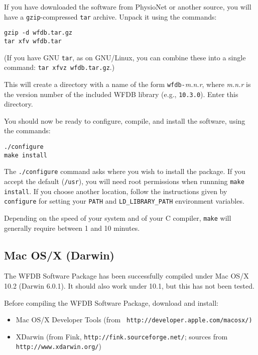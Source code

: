 \documentclass[twoside]{article}
\begin{document}
If you have downloaded the software from PhysioNet or another source, you
will have a {\tt gzip}-compressed {\tt tar} archive.  Unpack it using
the commands:

\begin{verbatim}
gzip -d wfdb.tar.gz
tar xfv wfdb.tar
\end{verbatim}

(If you have GNU {\tt tar}, as on GNU/Linux, you can combine these into a
single command: {\tt tar xfvz wfdb.tar.gz}.)

This will create a directory with a name of the form {\tt wfdb-}{\em m.n.r},
where {\em m.n.r} is the version number of the included WFDB library (e.g.,
{\tt 10.3.0}).  Enter this directory.

You should now be ready to configure, compile, and install the software, using
the commands:

\begin{verbatim}
./configure
make install
\end{verbatim}

The {\tt ./configure} command asks where you wish to install the package.
If you accept the default ({\tt /usr}), you will need root permissions when
runnning {\tt make install}.  If you choose another location, follow the
instructions given by {\tt configure} for setting your {\tt PATH} and
{\tt LD\_LIBRARY\_PATH} environment variables.

Depending on the speed of your system and of your C compiler, {\tt make} will
generally require between 1 and 10 minutes.

\subsection*{Mac OS/X (Darwin)}

The WFDB Software Package has been successfully compiled under Mac
OS/X 10.2 (Darwin 6.0.1).  It should also work under 10.1, but this
has not been tested.

Before compiling the WFDB Software Package, download and install:

\begin{itemize}
\item
Mac OS/X Developer Tools (from {\tt
http://\-devel\-oper.\-apple.\-com/macosx/)}
\item
XDarwin (from Fink, {\tt http://\-fink.\-source\-forge.\-net/};
sources from {\tt http://\-www.\-xdar\-win.\-org/})
\end{itemize}
\end{document}
